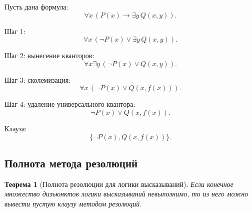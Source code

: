 \documentclass[12pt,a4paper]{article}
\newtheorem{theorem}{Теорема}
\begin{document}
Пусть дана формула:
$$
\forall x\,(P(x) \to \exists y\, Q(x,y)).
$$

Шаг 1:
$$
\forall x\,(\neg P(x) \lor \exists y\, Q(x,y)).
$$

Шаг 2: вынесение кванторов:
$$
\forall x \exists y\,(\neg P(x) \lor Q(x,y)).
$$

Шаг 3: сколемизация:
$$
\forall x\,(\neg P(x) \lor Q(x,f(x))).
$$

Шаг 4: удаление универсального квантора:
$$
\neg P(x) \lor Q(x,f(x)).
$$

Клауза:
$$
\{\neg P(x), Q(x,f(x))\}.
$$

\subsection{Полнота метода резолюций}

\begin{theorem}[Полнота резолюции для логики высказываний]
Если конечное множество дизъюнктов логики высказываний невыполнимо, то из него можно вывести пустую клаузу методом резолюций.
\end{theorem}
\end{document}
